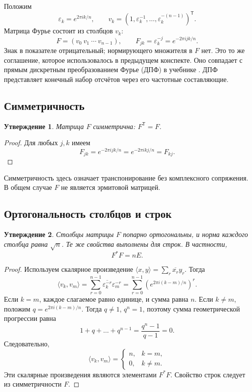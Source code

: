 \documentclass[12pt,a4paper]{article}
\newtheorem{proposition}{Утверждение}
\theoremstyle{definition}
\theoremstyle{remark}
\newcommand{\eps}{\varepsilon}
\begin{document}
Положим
\[
  \eps_k=e^{2\pi i k/n},\qquad
  v_k=(1,\eps_k^{-1},\dots,\eps_k^{-(n-1)})^{\mathsf T}.
\]
Матрица Фурье состоит из столбцов $v_k$:
\[
  F=(v_0\ v_1\ \cdots\ v_{n-1}),\qquad
  F_{jk}=\eps_k^{-j}=e^{-2\pi i jk/n}.
\]
Знак в показателе отрицательный; нормирующего множителя в $F$ нет.
Это то же соглашение, которое использовалось в предыдущем конспекте.
Оно совпадает с прямым дискретным преобразованием Фурье (ДПФ)
в учебнике \cite[\S\,4.4.1, с.~269]{GW2012}.
ДПФ представляет конечный набор отсчётов через его частотные составляющие.

\subsection{Симметричность}

\begin{proposition}
Матрица $F$ симметрична: $F^{\mathsf T}=F$.
\end{proposition}

\begin{proof}
Для любых $j,k$ имеем
\[
  F_{jk}=e^{-2\pi i jk/n}=e^{-2\pi i kj/n}=F_{kj}.
\]
\end{proof}

Симметричность здесь означает транспонирование без комплексного
сопряжения. В общем случае $F$ не является эрмитовой матрицей.

\subsection{Ортогональность столбцов и строк}

\begin{proposition}
Столбцы матрицы $F$ попарно ортогональны, и норма каждого столбца равна
$\sqrt n$. Те же свойства выполнены для строк. В частности,
\[
  \boxed{F^*F=nE}.
\]
\end{proposition}

\begin{proof}
Используем скалярное произведение
$\langle x,y\rangle=\sum_r\overline{x_r}y_r$. Тогда
\[
  \langle v_k,v_m\rangle
  =\sum_{r=0}^{n-1}\overline{\eps_k^{-r}}\eps_m^{-r}
  =\sum_{r=0}^{n-1}\left(e^{2\pi i(k-m)/n}\right)^r.
\]
Если $k=m$, каждое слагаемое равно единице, и сумма равна $n$.
Если $k\ne m$, положим $q=e^{2\pi i(k-m)/n}$. Тогда $q\ne1$, $q^n=1$,
поэтому сумма геометрической прогрессии равна
\[
  1+q+\dots+q^{n-1}=\frac{q^n-1}{q-1}=0.
\]
Следовательно,
\[
  \langle v_k,v_m\rangle=
  \begin{cases}n,&k=m,\\0,&k\ne m.\end{cases}
\]
Эти скалярные произведения являются элементами $F^*F$.
Свойство строк следует из симметричности $F$.
\end{proof}
\end{document}
